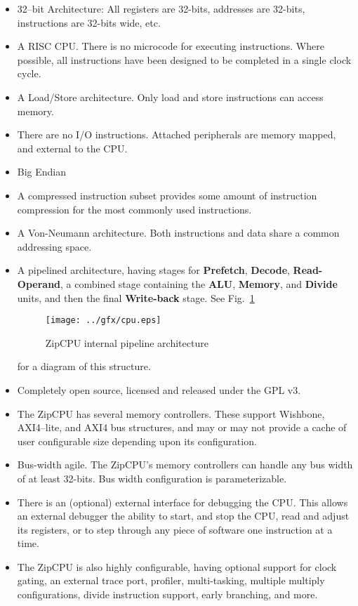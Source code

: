 \documentclass{gqtekspec}
\begin{document}
\begin{itemize}
\item 32--bit Architecture: All registers are 32-bits, addresses are 32-bits,
		instructions are 32-bits wide, etc.

\item A RISC CPU.  There is no microcode for executing instructions.
	Where possible, all instructions have been designed to be completed
	in a single clock cycle.

\item A Load/Store architecture.  Only load and store instructions
	can access memory.

\item There are no I/O instructions.  Attached peripherals are memory
	mapped, and external to the CPU.

\item Big Endian

\item A compressed instruction subset provides some amount of instruction
	compression for the most commonly used instructions.

\item A Von-Neumann architecture.  Both instructions and data share a 
	common addressing space.

\item A pipelined architecture, having stages for {\bf Prefetch},
	{\bf Decode}, {\bf Read-Operand}, a combined stage containing
	the {\bf ALU}, {\bf Memory}, and {\bf Divide} units, and then the
	final {\bf Write-back} stage.  See Fig.~\ref{fig:cpu}
\begin{figure}\begin{center}
\texttt{[image: ../gfx/cpu.eps]}
\caption{ZipCPU internal pipeline architecture}\label{fig:cpu}
\end{center}\end{figure}
	for a diagram of this structure.

\item Completely open source, licensed and released under the GPL v3.

\item The ZipCPU has several memory controllers.  These support Wishbone,
	AXI4--lite, and AXI4 bus structures, and may or may not provide a
	cache of user configurable size depending upon its configuration.

\item Bus-width agile.  The ZipCPU's memory controllers can handle any bus
	width of at least 32-bits.  Bus width configuration is parameterizable.

\item There is an (optional) external interface for debugging the CPU.  This
	allows an external debugger the ability to start, and stop the CPU,
	read and adjust its registers, or to step through any piece of software
	one instruction at a time.

\item The ZipCPU is also highly configurable, having optional support for
	clock gating, an external trace port, profiler, 
	multi-tasking, multiple multiply configurations, divide instruction
	support, early branching, and more.
\end{itemize}
\end{document}
